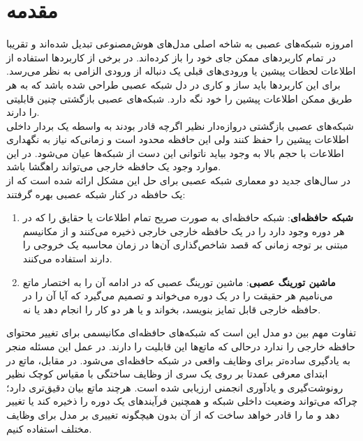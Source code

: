 \chapter{مقدمه}

امروزه شبکه‌های عصبی به شاخه اصلی مدل‌های هوش‌مصنوعی تبدیل شده‌‌اند و تقریبا در تمام کاربردهای ممکن جای خود را باز کرده‌اند. در برخی از کاربردها استفاده از اطلاعات لحظات پیشین یا ورودی‌های قبلی یک دنباله از ورودی الزامی به نظر می‌رسد. برای این کاربردها باید ساز و کاری در دل شبکه عصبی طراحی شده باشد که به هر طریق ممکن اطلاعات پیشین را خود نگه دارد. شبکه‌های عصبی بازگشتی چنین قابلیتی را دارند.
\\

شبکه‌های عصبی بازگشتی دروازه‌دار نظیر  اگرچه قادر بودند به واسطه یک بردار داخلی اطلاعات پیشین را حفظ کنند ولی این حافظه محدود است و زمانی‌که نیاز به نگهداری اطلاعات با حجم بالا به وجود بیاید ناتوانی این دست از شبکه‌ها عیان می‌شود. در این موارد وجود یک حافظه خارجی می‌تواند راهگشا باشد.
\\

در سال‌های جدید دو معماری شبکه عصبی برای حل این مشکل ارائه شده است که از یک حافظه در کنار شبکه عصبی بهره گرفتند:
\begin{enumerate}
\item \textbf{شبکه حافظه‌ای}: شبکه حافظه‌ای به صورت صریح تمام اطلاعات یا حقایق را که در هر دوره وجود دارد را در یک حافظه خارجی خارجی ذخیره می‌کنند و از مکانیسم مبتنی بر توجه زمانی که قصد شاخص‌گذاری آن‌ها در زمان محاسبه یک خروجی را دارند استفاده می‌کنند.
\item \textbf{ماشین‌ تورینگ عصبی}: ماشین تورینگ عصبی  که در ادامه آن را به اختصار ماتع می‌نامیم هر حقیقت را در یک دوره می‌خواند و تصمیم می‌گیرد که آیا آن را در حافظه خارجی قابل تمایز بنویسد، بخواند و یا هر دو کار را انجام دهد یا نه.\cite{gulcehre2018dynamic}
\end{enumerate}

تفاوت مهم بین دو مدل این است که شبکه‌های حافظه‌ای مکانیسمی برای تغییر محتوای حافظه خارجی را ندارد درحالی که ماتع‌ها این قابلیت را دارند. در عمل این مسئله منجر به یادگیری ساده‌تر برای وظایف واقعی در شبکه حافظه‌ای می‌شود. در مقابل، ماتع در ابتدای معرفی عمدتا بر روی یک سری از وظایف ساختگی  با مقیاس کوچک نظیر رونوشت‌گیری و یادآوری انجمنی ارزیابی شده است. هرچند ماتع بیان دقیق‌تری دارد؛ چراکه می‌تواند وضعیت داخلی شبکه و همچنین فرآیند‌های یک دوره را ذخیره کند یا تغییر دهد و ما را قادر خواهد ساخت که از آن بدون هیچگونه تغییری بر مدل برای وظایف مختلف استفاده کنیم.\cite{gulcehre2018dynamic}
\\

